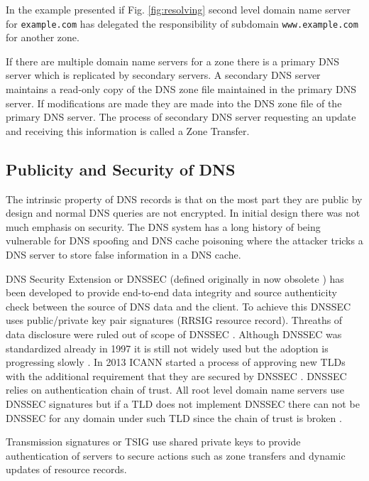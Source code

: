 In the example presented if Fig. \ref{fig:resolving} second level domain name server for \texttt{example.com} has delegated the responsibility of subdomain \texttt{www.example.com} for another zone.

If there are multiple domain name servers for a zone there is a primary DNS server which is replicated by secondary servers. A secondary DNS server maintains a read-only copy of the DNS zone file maintained in the primary DNS server. If modifications are made they are made into the DNS zone file of the primary DNS server. The process of secondary DNS server requesting an update and receiving this information is called a Zone Transfer. \citep{tanenbaum}

\subsection{Publicity and Security of DNS}
\label{sec:dns_security}


The intrinsic property of DNS records is that on the most part they are public by design and normal DNS queries are not encrypted. In initial design there was not much emphasis on security. The DNS system has a long history of being vulnerable for DNS spoofing and DNS cache poisoning where the attacker tricks a DNS server to store false information in a DNS cache. \cite{tanenbaum}\cite{RFC_threat_analysis} 

DNS Security Extension or DNSSEC (defined originally in now obsolete \cite{RFC_2065}) has been developed to provide end-to-end data integrity and source authenticity check between the source of DNS data and the client. To achieve this DNSSEC uses public/private key pair signatures (RRSIG resource record). Threaths of data disclosure were ruled out of scope of DNSSEC \cite{RFC_threat_analysis}. Although DNSSEC was standardized already in 1997 it is still not widely used but the adoption is progressing slowly \cite{lotr}. In 2013 ICANN started a process of approving new TLDs with the additional requirement that they are secured by DNSSEC \cite{sweden}. DNSSEC relies on authentication chain of trust. All root level domain name servers use DNSSEC signatures but if a TLD does not implement DNSSEC there can not be DNSSEC for any domain under such TLD since the chain of trust is broken \cite{lotr}.

Transmission signatures or TSIG \cite{RFC_2845_trans_sec} use shared private keys to provide authentication of servers to secure actions such as zone transfers and dynamic updates of resource records.

